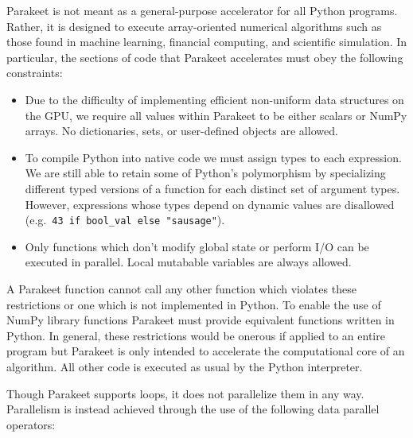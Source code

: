 \documentclass[10pt,twocolumn]{article}
\begin{document}
Parakeet is not meant as a general-purpose accelerator for all Python programs.  Rather, it is designed to execute array-oriented numerical algorithms such as those found in machine learning, financial computing, and scientific simulation. In particular, the sections of code that Parakeet accelerates must obey the following constraints:

\begin{itemize}
\item Due to the difficulty of implementing efficient non-uniform data structures on the GPU, we require all values within Parakeet to be either scalars or NumPy arrays. No dictionaries, sets, or user-defined objects are allowed. 
\item To compile Python into native code we must assign types to each expression. We are still able to retain some of Python's polymorphism by specializing different typed versions of a function for each distinct set of argument types. However, expressions whose types depend on dynamic values are disallowed (e.g.~\lstinline{43 if bool_val else "sausage"}).
\item Only functions which don't modify global state or perform I/O can be executed in parallel. Local mutabable variables are always allowed.
\end{itemize}
A Parakeet function cannot call any other function which violates these restrictions or one which is not implemented in Python. To enable the use of NumPy library functions Parakeet must provide equivalent functions written in Python. In general, these restrictions would be onerous if applied to an entire program but Parakeet is only intended to accelerate the computational core of an algorithm. All other code is executed as usual by the Python interpreter. 

Though Parakeet supports loops, it does not parallelize them in any way. Parallelism is instead achieved through the use of the following data parallel operators:
\end{document}
